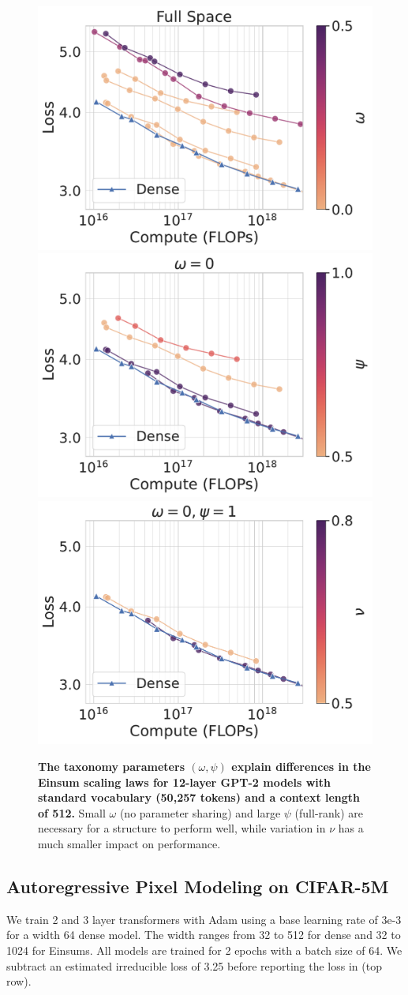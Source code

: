 \documentclass{article}
\begin{document}
\begin{figure}[!t]
\centering
    \includegraphics[height=0.23\linewidth]{figs/rebuttal/full_vocab/omega.pdf}
    \includegraphics[height=0.23\linewidth]{figs/rebuttal/full_vocab/psi.pdf}
    \includegraphics[height=0.23\linewidth]{figs/rebuttal/full_vocab/nu.pdf}
   \caption{
   \textbf{The taxonomy parameters $(\omega, \psi)$ explain differences in the Einsum scaling laws for 12-layer GPT-2 models with standard vocabulary (50,257 tokens) and a context length of 512.} Small $\omega$ (no parameter sharing) and large $\psi$ (full-rank) are necessary for a structure to perform well, while variation in $\nu$ has a much smaller impact on performance.
   }
    \label{fig:original_gpt_scaling_laws_analysis}
    \vspace{-5mm}
\end{figure}

\subsection{Autoregressive Pixel Modeling on CIFAR-5M}
We train 2 and 3 layer transformers with Adam using a base learning rate of 3e-3 for a width 64 dense model. The width ranges from 32 to 512 for dense and 32 to 1024 for Einsums. All models are trained for 2 epochs with a batch size of 64. We subtract an estimated irreducible loss of 3.25 before reporting the loss in  (top row).
\end{document}
